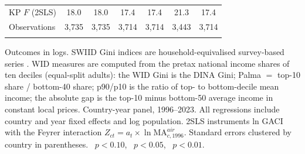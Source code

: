 \begin{table}[H]
\begin{threeparttable}
\begin{tabular}{lcccccc}
KP $F$ (2SLS) & 18.0 & 18.0 & 17.4 & 17.4 & 21.3 & 17.4 \\
Observations & 3{,}735 & 3{,}735 & 3{,}714 & 3{,}714 & 3{,}443 & 3{,}714 \\
\addlinespace
\bottomrule
\end{tabular}
\begin{tablenotes}\small
\item Outcomes in logs. SWIID Gini indices are household-equivalised survey-based series \citep{Solt_2020}. WID measures are computed from the pretax national income shares of ten deciles (equal-split adults): the WID Gini is the DINA Gini; Palma $=$ top-10 share / bottom-40 share; p90/p10 is the ratio of top- to bottom-decile mean income; the absolute gap is the top-10 minus bottom-50 average income in constant local prices. Country-year panel, 1996--2023. All regressions include country and year fixed effects and log population. 2SLS instruments ln GACI with the Feyrer interaction $Z_{ct}=a_t\times\ln \mathrm{MA}^{air}_{c,1996}$. Standard errors clustered by country in parentheses. \sym{*}~$p<0.10$, \sym{**}~$p<0.05$, \sym{***}~$p<0.01$.
\end{tablenotes}
\end{threeparttable}
\end{table}
